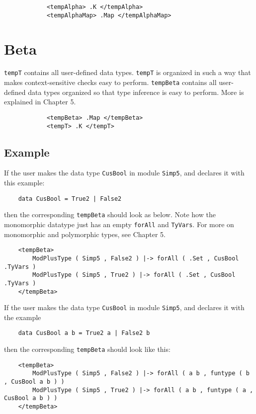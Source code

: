 \begin{lstlisting}
            <tempAlpha> .K </tempAlpha>
            <tempAlphaMap> .Map </tempAlphaMap>
\end{lstlisting}

\section{Beta}

\texttt{tempT} contains all user-defined data types. \texttt{tempT} is organized in such a way that makes context-sensitive checks easy to perform. \texttt{tempBeta} contains all user-defined data types organized so that type inference is easy to perform. More is explained in Chapter 5.
\begin{lstlisting}
            <tempBeta> .Map </tempBeta>
            <tempT> .K </tempT>
\end{lstlisting}

\subsection{Example}
If the user makes the data type \texttt{CusBool} in module \texttt{Simp5}, and declares it with this example:
\begin{lstlisting}
	data CusBool = True2 | False2
\end{lstlisting}

\noindent
then the corresponding \texttt{tempBeta} should look as below. Note how the monomorphic datatype just has an empty \texttt{forAll} and \texttt{TyVars}. For more on monomorphic and polymorphic types, see Chapter 5.

\begin{lstlisting}
    <tempBeta>
        ModPlusType ( Simp5 , False2 ) |-> forAll ( .Set , CusBool .TyVars )
        ModPlusType ( Simp5 , True2 ) |-> forAll ( .Set , CusBool .TyVars )
    </tempBeta>
\end{lstlisting}

If the user makes the data type \texttt{CusBool} in module \texttt{Simp5}, and declares it with the example
\begin{lstlisting}
	data CusBool a b = True2 a | False2 b
\end{lstlisting}

\noindent
then the corresponding \texttt{tempBeta} should look like this:
\begin{lstlisting}
    <tempBeta>
        ModPlusType ( Simp5 , False2 ) |-> forAll ( a b , funtype ( b , CusBool a b ) )
        ModPlusType ( Simp5 , True2 ) |-> forAll ( a b , funtype ( a , CusBool a b ) )
    </tempBeta>

\end{lstlisting}

